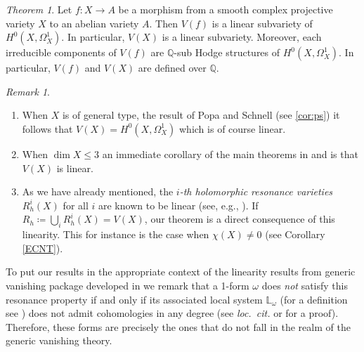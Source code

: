 \documentclass[a4paper,12pt,reqno]{amsart}
\theoremstyle{plain}
\theoremstyle{definition}
\theoremstyle{remark}
\newtheorem{remark}[theorem]{Remark}
\newcommand{\Q}{\mathbb Q}
\newtheorem{alphtheorem}{Theorem}
\newcommand{\bbL}{\mathbb{L}}
\begin{document}
\begin{alphtheorem}\label{main1}
Let $f: X\to A$ be a morphism from a smooth complex projective variety $X$ to an abelian variety $A$. Then 
$V(f)$ is a linear subvariety of $H^0(X, \Omega_X^1)$. In particular, $V(X)$ is a linear subvariety. Moreover, each irreducible components of $V(f)$ are $\Q$-sub Hodge structures of $H^0(X, \Omega_X^1)$. In particular, $V(f)$ and $V(X)$ are defined over $\Q$.

\end{alphtheorem}
\begin{remark}
\begin{enumerate}
	\item When $X$ is of general type, the 
	result of Popa and Schnell (see \ref{cor:ps}) 
	it follows that $V(X) = H^0(X,\Omega_X^1)$ which is of course
	linear. 
	\item  When $\dim X\leq 3$ an immediate corollary of the main theorems in \cite{SS19} and \cite{HS19} is that $V(X)$ is linear.
	\item \label{item:resonance} As we have already mentioned, the \emph{$i$-th holomorphic resonance varieties} $R^i_h(X)$ for
	all $i$ are 
	known to be linear (see, e.g., \cite{DiPa13}). 
	If $R_h \coloneqq \bigcup_{i} R_h^	i(X)= V(X)$, our theorem is a direct consequence of
	this linearity. This 
	for instance is the case when $\chi(X)\not=0$ (see Corollary \ref{ECNT}). 
\end{enumerate}

\end{remark}

To put our results in the appropriate context of the linearity results from generic vanishing package developed
in \cite{Ara92, GL87, Sim93b}
we remark that a 1-form $\omega$ does \emph{not} satisfy this resonance property if and only if its associated local
system $\bbL_\omega$ (for a definition see \cite[\S 2.2]{SS19}) does not
admit cohomologies in any degree (see \textit{loc.\ cit.} or \cite[Theorem 4.2]{Sim93} for a proof). Therefore, these forms are precisely the ones that do not fall in the
realm of the generic vanishing theory. 
\end{document}
